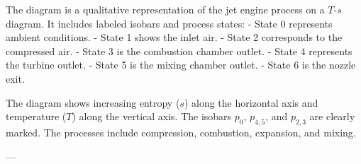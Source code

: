 The diagram is a qualitative representation of the jet engine process on a \( T \)-\( s \) diagram. It includes labeled isobars and process states:  
- State 0 represents ambient conditions.  
- State 1 shows the inlet air.  
- State 2 corresponds to the compressed air.  
- State 3 is the combustion chamber outlet.  
- State 4 represents the turbine outlet.  
- State 5 is the mixing chamber outlet.  
- State 6 is the nozzle exit.  

The diagram shows increasing entropy (\( s \)) along the horizontal axis and temperature (\( T \)) along the vertical axis. The isobars \( p_0 \), \( p_{4,5} \), and \( p_{2,3} \) are clearly marked. The processes include compression, combustion, expansion, and mixing.  

---